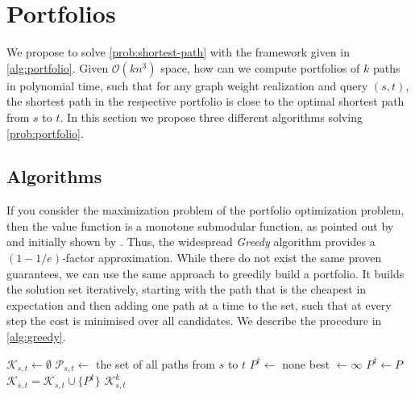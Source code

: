 \section{Portfolios}
\label{sec:portfolios}

We propose to solve \cref{prob:shortest-path} with the framework given in \cref{alg:portfolio}. Given $\mathcal O(k n^3)$ space, how can we compute portfolios of $k$ paths in polynomial time, such that for any graph weight realization and query $(s, t)$, the shortest path in the respective portfolio is close to the optimal shortest path from $s$ to $t$.
In this section we propose three different algorithms solving \cref{prob:portfolio}.

\subsection{Algorithms}
\label{sec:algorithms}

If you consider the maximization problem of the portfolio optimization problem, then the value function is a monotone submodular function, as pointed out by \cite{miltos} and initially shown by \cite{kr18}. Thus, the widespread \textit{Greedy} algorithm provides a $(1 - 1/e)$-factor approximation.
While there do not exist the same proven guarantees, we can use the same approach to greedily build a portfolio.
It builds the solution set iteratively, starting with the path that is the cheapest in expectation and then adding one path at a time to the set, such that at every step the cost is minimised over all candidates. We describe the procedure in \cref{alg:greedy}.

\begin{algorithm}
\caption{Greedy Algorithm for .}
\label{alg:greedy}
\begin{algorithmic}[1]
\State $\mathcal K_{s,t} \gets \emptyset$
\State $\mathcal P_{s,t} \gets$ the set of all paths from $s$ to $t$
  \State $P^\dagger \gets$ none
  \State best $\gets \infty$ 
      \State $P^\dagger \gets P$
    \EndIf
  \EndFor
  \State $\mathcal K_{s,t} =\mathcal K_{s,t} \cup \{P^\dagger\}$ 
\EndFor
\State \Return $\mathcal K^k_{s,t}$
\EndProcedure
\end{algorithmic}
\end{algorithm}

